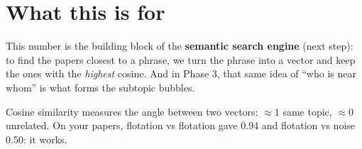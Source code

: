 \documentclass[11pt,a4paper]{article}
\begin{document}
\section{What this is for}

This number is the building block of the \textbf{semantic search engine} (next step): to find
the papers closest to a phrase, we turn the phrase into a vector and keep the ones with the
\emph{highest} cosine. And in Phase 3, that same idea of ``who is near whom'' is what forms
the subtopic bubbles.

\begin{resumen}
Cosine similarity measures the angle between two vectors: $\approx 1$ same topic, $\approx 0$
unrelated. On your papers, flotation vs flotation gave 0.94 and flotation vs noise 0.50: it
works.
\end{resumen}
\end{document}
